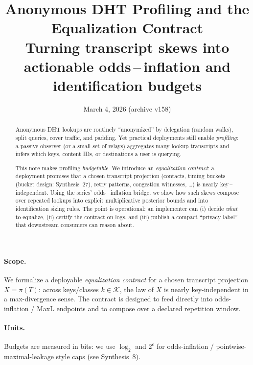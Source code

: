 \documentclass[11pt]{article}
\title{Anonymous DHT Profiling and the Equalization Contract\\
\large Turning transcript skews into actionable odds\,--\,inflation and identification budgets}
\author{}
\date{March 4, 2026 (archive v158)}
\begin{document}
\maketitle

\begin{abstract}
Anonymous DHT lookups are routinely ``anonymized'' by delegation (random walks), split queries, cover traffic, and padding.
Yet practical deployments still enable \emph{profiling}: a passive observer (or a small set of relays) aggregates many lookup transcripts and infers which keys, content IDs, or destinations a user is querying.

This note makes profiling \emph{budgetable}.
We introduce an \emph{equalization contract}: a deployment promises that a chosen transcript projection (contacts, timing buckets (bucket design: Synthesis~27)\cite{series:bucketdesign}, retry patterns, congestion witnesses, \dots) is nearly key\,--\,independent.
Using the series' odds\,--\,inflation bridge, we show how such skews compose over repeated lookups into explicit multiplicative posterior bounds and into identification sizing rules.
The point is operational: an implementer can (i) decide \emph{what} to equalize, (ii) certify the contract on logs, and (iii) publish a compact ``privacy label'' that downstream consumers can reason about.
\end{abstract}


\paragraph{Scope.}
We formalize a deployable \emph{equalization contract} for a chosen transcript projection $X=\pi(T)$:
across keys/classes $k\in\mathcal K$, the law of $X$ is nearly key-independent in a max-divergence sense.
The contract is designed to feed directly into odds-inflation / MaxL endpoints and to compose over a declared repetition window.

\paragraph{Units.} Budgets are measured in bits: we use $\log_2$ and $2^{\epsilon}$ for odds-inflation / pointwise-maximal-leakage style caps (see Synthesis~8).\cite{series:notation}
\end{document}
